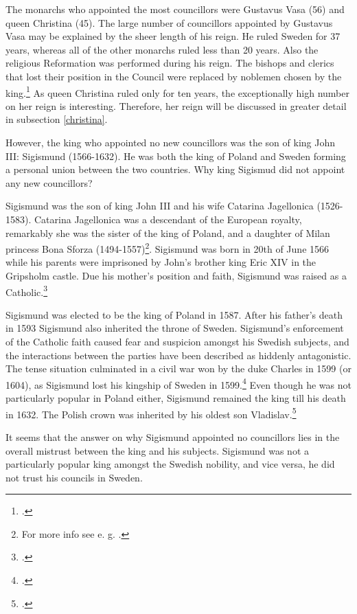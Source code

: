 The monarchs who appointed the most councillors were Gustavus Vasa (56) and queen Christina (45). The large number of councillors appointed by Gustavus Vasa may be explained by the sheer length of his reign. He ruled Sweden for 37 years, whereas all of the other monarchs ruled less than 20 years. Also the religious Reformation was performed during his reign. The bishops and clerics that lost their position in the Council were replaced by noblemen chosen by the king.\footcite[p. 74.]{pSuurvalta} As queen Christina ruled only for ten years, the exceptionally high number on her reign is interesting. Therefore, her reign will be discussed in greater detail in subsection \ref{christina}. 

However, the king who appointed no new councillors was the son of king John III: Sigismund (1566-1632). He was both the king of Poland and Sweden forming a personal union between the two countries. Why king Sigismud did not appoint any new councillors? 

Sigismund was the son of king John III and his wife Catarina Jagellonica (1526-1583). Catarina Jagellonica was a descendant of the European royalty, remarkably she was the sister of the king of Poland, and a daughter of Milan princess Bona Sforza (1494-1557)\footnote{For more info see e. g. \cite{bona_sforza}.}. Sigismund was born in 20th of June 1566 while his parents were imprisoned by John's brother king Eric XIV in the Gripsholm castle. Due his mother's position and faith, Sigismund was raised as a Catholic.\footcite[p. 27, 47.]{lappalainen09}

Sigismund was elected to be the king of Poland in 1587. After his father's death in 1593 Sigismund also inherited the throne of Sweden. Sigismund's enforcement of the Catholic faith caused fear and suspicion amongst his Swedish subjects, and the interactions between the parties have been described as hiddenly antagonistic. The tense situation culminated in a civil war won by the duke Charles in 1599 (or 1604), as Sigismund lost his kingship of Sweden in 1599.\footcites[pp. 49-52, 78-81, 100-111, 259-267.]{lappalainen09}{sbl_sigismund} Even though he was not particularly popular in Poland either, Sigismund remained the king till his death in 1632. The Polish crown was inherited by his oldest son Vladislav.\footcite{sbl_sigismund}

It seems that the answer on why Sigismund appointed no councillors lies in the overall mistrust between the king and his subjects. Sigismund was not a particularly popular king amongst the Swedish nobility, and vice versa, he did not trust his councils in Sweden. 

